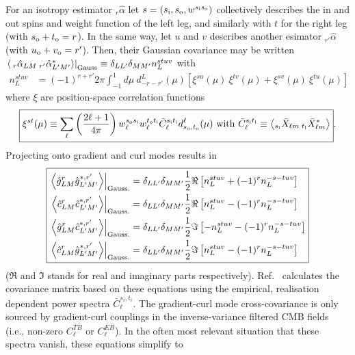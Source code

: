 \documentclass{article}
\newcommand{\si}[0]{{s_{\rm i}}}
\newcommand{\ti}[0]{{t_{\rm i}}}
\newcommand{\so}[0]{{s_{\rm o}}}
\renewcommand{\to}[0]{{t_{\rm o}}}
\newcommand{\uo}[0]{{u_{\rm o}}}
\newcommand{\vo}[0]{{v_{\rm o}}}
\newcommand{\av}[1]{\left\langle #1 \right\rangle}
\begin{document}
For an isotropy estimator $_{r}\hat \alpha$ let $s = (\si, \so, w^{\si\so})$ collectively describes the in and out spins and weight function of the left leg, and similarly with $t$ for the right leg (with $\so + \to = r$). In the same way, let $u$ and $v$ describes another esimator $_{r'}\hat \alpha$ (with $\uo + \vo = r'$). Then, their Gaussian covariance may be written $ \left.\av{\:_{r}\hat \alpha_{LM}\: _{r'}\hat \alpha^*_{L'M'}} \right|_{\rm Gauss} \equiv \delta_{LL'}\delta_{MM'}n_L^{stuv}$ with
\begin{equation}
\boxed{
\begin{split} 
n_L^{stuv} & = (-1)^{r + r'}2\pi  \int_{-1}^1 d \mu\:  d^L_{-r -r'}(\mu) \left[\xi^{su}(\mu)\:\xi^{tv}(\mu)  + \xi^{sv}(\mu)\:\xi^{tu}(\mu) \right]
\end{split}}
\end{equation}
where $\xi$ are position-space correlation functions
\begin{equation}\boxed{
\xi^{st}(\mu) \equiv  \sum_\ell \left(\frac{2\ell + 1}{4\pi}\right)w^{\so\si}_\ell w^{\to\ti}_\ell \bar C_\ell^{\si \ti} d^\ell_{\so,\to}(\mu)\textrm{ with } \bar C_\ell^{\si \ti} \equiv \av{ _{\si}\bar X_{\ell m}\: _{\ti} \bar X^*_{\ell m} }}.
\end{equation}
Projecting onto gradient and curl modes results in
\begin{equation} \boxed{
\begin{split}
\left.\av{\hat g^{r}_{LM} \hat g^{*, r'}_{L' M'} }\right|_{\rm Gauss.} &=\delta_{LL'}\delta_{MM'} \frac 12 \Re\left[n_L^{stuv} +  (-1)^{r} n^{-s-tuv}_L\right] \\
		\left.\av{\hat c^{r}_{LM} \hat c^{*, r'}_{L' M'} }\right|_{\rm Gauss.} &= \delta_{LL'}\delta_{MM'}\frac 12 \Re\left[n_L^{stuv} -  (-1)^{r} n^{-s-tuv}_L\right]\\
	\left.\av{\hat g^{r}_{LM} \hat c^{*, r'}_{L' M'} }\right|_{\rm Gauss.} &= \delta_{LL'}\delta_{MM'}\frac 12 \Im\left[-n_L^{stuv} -  (-1)^{r} n^{-s-tuv}_L\right] \\ \left.\av{\hat c^{r}_{LM} \hat g^{*, r'}_{L' M'} }\right|_{\rm Gauss.} &= \delta_{LL'}\delta_{MM'}\frac 12 \Im\left[n_L^{stuv} -  (-1)^{r} n^{-s-tuv}_L\right]
\end{split}}
\end{equation}
($\Re$ and $\Im$ stands for real and imaginary parts respectively). 
Ref.~\cite{Aghanim:2018oex} calculates the covariance matrix based on these equations using the empirical, realisation dependent power spectra $\bar C_\ell^{s_i,t_i}$. The gradient-curl mode cross-covariance is only sourced by gradient-curl couplings in the inverse-variance filtered CMB fields (i.e., non-zero $C_\ell^{\bar T \bar B}$ or $C_\ell^{\bar E \bar B}$). In the often most relevant situation that these spectra vanish, these equations simplify to
\end{document}
